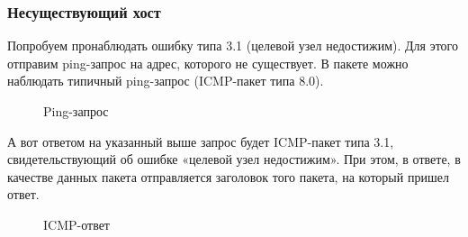 \documentclass[a4paper, 14pt,russian]{article}
\begin{document}
	\subsubsection{Несуществующий хост}
	Попробуем пронаблюдать ошибку типа 3.1 (целевой узел недостижим). Для этого отправим ping-запрос на адрес, которого не существует.																																						
	В пакете можно наблюдать типичный ping-запрос (ICMP-пакет типа 8.0).
	\begin{figure}[h!]
		\caption{Ping-запрос}
		\label{img:error_ping}
	\end{figure}

	А вот ответом на указанный выше запрос будет ICMP-пакет типа 3.1, свидетельствующий об ошибке «целевой узел недостижим». При этом, в ответе, в качестве данных пакета отправляется заголовок того пакета, на который пришел ответ.
	\begin{figure}[h!]
		\caption{ICMP-ответ}
		\label{img:error_ping2}
	\end{figure}

\newpage
\end{document}

